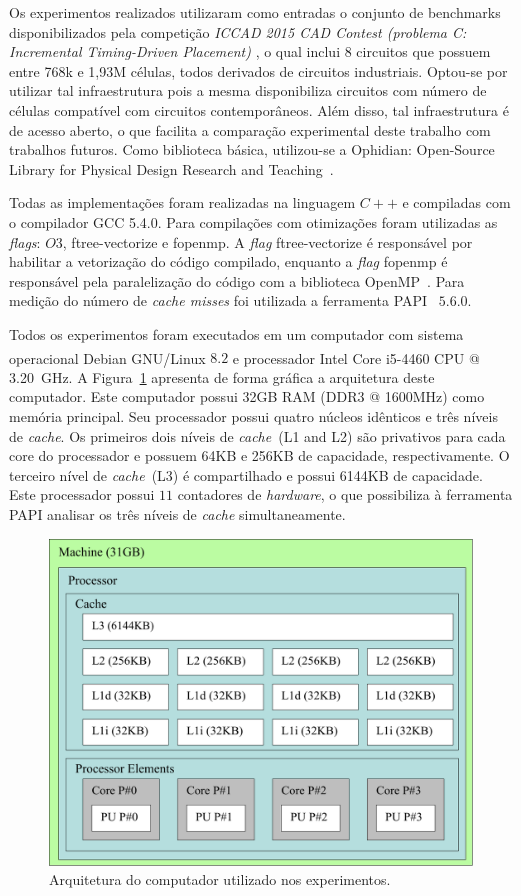 Os experimentos realizados utilizaram como entradas o conjunto de benchmarks disponibilizados pela competição \textit{ICCAD 2015 CAD Contest (problema C: Incremental Timing-Driven Placement)} \cite{kim2015}, o qual inclui 8 circuitos que possuem entre 768k e 1,93M células, todos derivados de circuitos industriais. Optou-se por utilizar tal infraestrutura pois a mesma disponibiliza circuitos com número de células compatível com circuitos contemporâneos. Além disso, tal infraestrutura é de acesso aberto, o que facilita a comparação experimental deste trabalho com trabalhos futuros. Como biblioteca básica, utilizou-se a Ophidian: Open-Source Library for Physical Design Research and Teaching~\cite{ophidian}.

Todas as implementações foram realizadas na linguagem $C++$ e compiladas com o compilador GCC 5.4.0. Para compilações com otimizações foram utilizadas as \textit{flags}: $O3$, ftree-vectorize e fopenmp. A \textit{flag} ftree-vectorize é responsável por habilitar a vetorização do código compilado, enquanto a \textit{flag} fopenmp é responsável pela paralelização do código com a biblioteca OpenMP~\cite{openmp}. Para medição do número de  \textit{cache misses} foi utilizada a ferramenta PAPI~\cite{papi} $5.6.0$.

Todos os experimentos foram executados em um computador com sistema operacional Debian GNU/Linux $8.2$ e processador Intel\textsuperscript{\textregistered} Core\textsuperscript{\textregistered} i5-4460 CPU @ 3.20~GHz.
A Figura~\ref{fig:architectureMemoryZeus} apresenta de forma gráfica a arquitetura deste computador.
Este computador possui 32GB RAM (DDR3 @ 1600MHz) como memória principal.
Seu processador possui quatro núcleos idênticos e três níveis de \textit{cache}.
Os primeiros dois níveis de \textit{cache}~(L1 and L2) são privativos para cada core do processador e possuem 64KB e 256KB de capacidade, respectivamente.
O terceiro nível de \textit{cache}~(L3) é compartilhado e possui 6144KB de capacidade.
Este processador possui $11$ contadores de \textit{hardware}, o que possibiliza à ferramenta PAPI analisar os três níveis de \textit{cache} simultaneamente.

\begin{figure}[ht]
    \centering
    \includegraphics[width=0.5\linewidth]{img/results/architectureMemoryZeus.pdf}
    \caption{Arquitetura do computador utilizado nos experimentos.}
    \label{fig:architectureMemoryZeus}
\end{figure}


